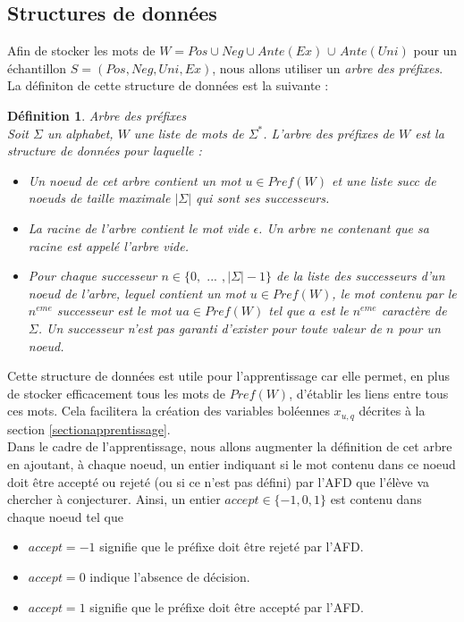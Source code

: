 \documentclass[12pt,a4paper,oneside,titlepage]{report}
\newtheorem{defi}{D\'efinition}[section]
\begin{document}
\subsection{Structures de données}
Afin de stocker les mots de $W=Pos\cup Neg\cup Ante(Ex)$ $\cup$ $Ante(Uni)$ pour un échantillon $S=(Pos, Neg, Uni, Ex)$, nous allons utiliser un \emph{arbre des préfixes}. La définiton de cette structure de données est la suivante :
\begin{defi}{Arbre des préfixes\\}
\label{prefixtree}
Soit $\Sigma$ un alphabet, $W$ une liste de mots de $\Sigma^*$. L'\emph{arbre des préfixes} de $W$ est la structure de données pour laquelle :
\begin{itemize}
\item Un \emph{noeud} de cet arbre contient un mot $u\in Pref(W)$ et une liste \emph{succ} de noeuds de taille maximale $|\Sigma|$ qui sont ses successeurs.
\item La racine de l'arbre contient le mot vide $\epsilon$. Un arbre ne contenant que sa racine est appelé l'\emph{arbre vide}.
\item Pour chaque successeur $n\in\{0,$ $...$ $,|\Sigma|-1\}$ de la liste des successeurs d'un noeud de l'arbre, lequel contient un mot $u\in Pref(W)$, le mot contenu par le $n^{eme}$ successeur est le mot $ua\in Pref(W)$ tel que $a$ est le $n^{eme}$ caractère de $\Sigma$. Un successeur n'est pas garanti d'exister pour toute valeur de $n$ pour un noeud.
\end{itemize}
\end{defi}
\noindent Cette structure de données est utile pour l'apprentissage car elle permet, en plus de stocker efficacement tous les mots de $Pref(W)$, d'établir les liens entre tous ces mots. Cela facilitera la création des variables boléennes $x_{u,q}$ décrites à la section \ref{sectionapprentissage}. \\
Dans le cadre de l'apprentissage, nous allons augmenter la définition de cet arbre en ajoutant, à chaque noeud, un entier indiquant si le mot contenu dans ce noeud doit être accepté ou rejeté (ou si ce n'est pas défini) par l'AFD que l'élève va chercher à conjecturer. Ainsi, un  entier $accept\in\{-1, 0, 1\}$ est contenu dans chaque noeud tel que
\begin{itemize}
\item $accept=-1$ signifie que le préfixe doit être rejeté par l'AFD.
\item $accept=0$ indique l'absence de décision.
\item $accept=1$ signifie que le préfixe doit être accepté par l'AFD.\\
\end{itemize}
\end{document}
